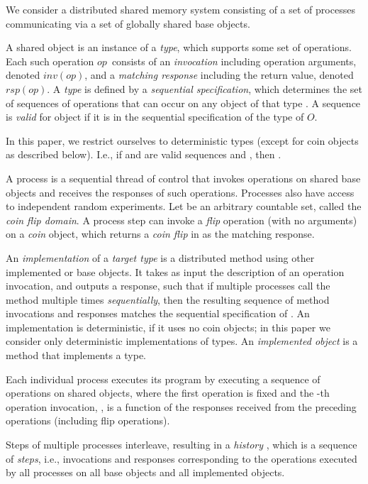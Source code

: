 \documentclass[11pt,letterpaper]{article}
\newcommand{\obj}{\ensuremath{\mathit{O}}}
\newcommand{\op}{\ensuremath{\mathit{op}}}
\newcommand{\inv}[1]{\ensuremath{inv(#1)}}
\newcommand{\rsp}[1]{\ensuremath{rsp(#1)}}
\begin{document}
We consider a distributed shared memory system consisting of a set  of  processes communicating via a set of globally shared base objects.

A shared object is an instance of a \emph{type}, which supports some set of operations.
Each such operation \op\ consists of an \emph{invocation} including operation arguments, denoted \inv{\op},
and a \emph{matching response} including the return value, denoted \rsp{\op}.
A \emph{type} is defined by a \emph{sequential specification}, which determines the set of sequences of operations that can occur on any object of that type \cite{her:lin}.
A sequence is \emph{valid} for object  if it is in the sequential specification of the type of \obj.

In this paper, we restrict ourselves to deterministic types (except for coin objects as described below).
I.e., if  and  are valid sequences and , then .

A process is a sequential thread of control that invokes operations on shared base objects and receives the responses of such operations.
Processes also have access to independent random experiments.
Let  be an arbitrary countable set, called the \emph{coin flip domain}.
A process step can invoke a \emph{flip} operation (with no arguments) on a \emph{coin} object,
which returns a \emph{coin flip} in  as the matching response.

An \emph{implementation} of a \emph{target type}  is a distributed method using other implemented or base objects.
It takes as input the description of an operation invocation, and outputs a response, such that if multiple processes call the method multiple times \emph{sequentially}, then the resulting sequence of method invocations and responses matches the sequential specification of . 
An implementation is deterministic, if it uses no coin objects; in this paper we consider only deterministic implementations of types.
An \emph{implemented object} is a method that implements a type.


Each individual process  executes its program by executing a sequence of operations on shared objects, where the first operation is fixed and the -th operation invocation, , is a function of the responses  received from the preceding  operations (including flip operations).


Steps of multiple processes interleave, resulting in a \emph{history} , which is a sequence of \emph{steps}, i.e., invocations and responses corresponding to the operations executed by all processes on all base objects and all implemented objects.
\end{document}
